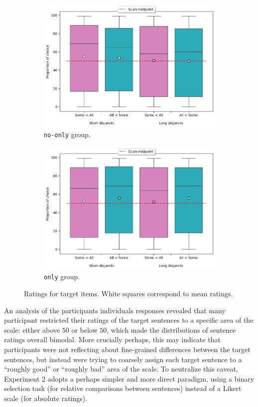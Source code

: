 \begin{figure}[H]
	\centering
	\begin{subfigure}[b]{.45\linewidth}
		\centering
		\includegraphics[width=\linewidth]{./exp1-target-noonly.png}
		\caption{\texttt{no-only} group.}
	\end{subfigure}
	\hfill
	\begin{subfigure}[b]{.45\linewidth}
		\centering
		\includegraphics[width=\linewidth]{./exp1-target-only.png}
		\caption{\texttt{only} group.}
	\end{subfigure}
	\caption{Ratings for target items. White squares correspond to mean ratings.}\label{fig7:exp1-targets}
\end{figure}


An analysis of the participants individuals responses revealed that many participant restricted their ratings of the target sentences to a specific area of the scale: either above $50$ or below $50$, which made the distributions of sentence ratings overall bimodal. More crucially perhaps, this may indicate that participants were not reflecting about fine-grained differences between the target sentences, but instead were trying to coarsely assign each target sentence to a ``roughly good'' or ``roughly bad'' area of the scale. To neutralize this caveat, Experiment 2 adopts a perhaps simpler and more direct paradigm, using a binary selection task (for relative comparisons between sentences) instead of a Likert scale (for absolute ratings).

